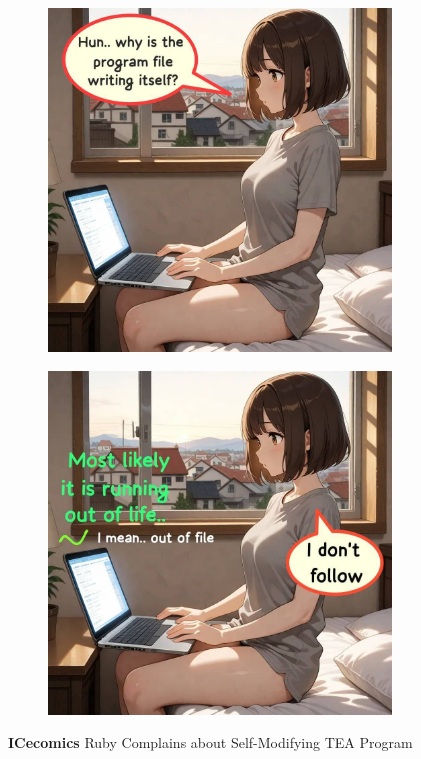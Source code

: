 \documentclass[a4paper, 18pt]{book} %
\begin{document}
\begin{figure}[H]
  \centering
  \begin{subfigure}[b]{0.45\textwidth}
    \includegraphics[width=\textwidth]{resources/images/self_mod1.jpg}
  \end{subfigure}
  \hfill
  \begin{subfigure}[b]{0.45\textwidth}
    \includegraphics[width=\textwidth]{resources/images/self_mod2.jpg}
  \end{subfigure}
  \caption{\textbf{ICecomics} Ruby Complains about Self-Modifying TEA Program}
  \label{FIGSELFMODDEMO}
\end{figure}
\end{document}
